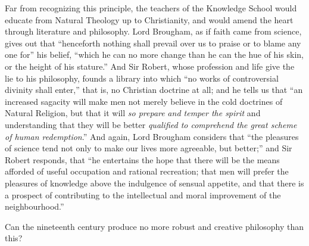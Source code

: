 Far from recognizing this principle, the teachers of the Knowledge
School would educate from Natural Theology up to Christianity, and
would amend the heart through literature and philosophy. Lord
Brougham, as if faith came from science, gives out that
``henceforth nothing shall prevail over us to praise or to blame
any one for'' his belief, ``which he can no more change than
he can the hue of his skin, or the height of his stature.'' And
Sir Robert, whose profession and life give the lie to his philosophy,
founds a library into which ``no works of controversial divinity
shall enter,'' that is, no Christian doctrine at all; and he tells
us that ``an increased sagacity will make men not merely believe
in the cold doctrines of Natural Religion, but that it will \emph{so
prepare} \emph{and temper the spirit} and understanding that
they will be better \emph{qualified to comprehend the great scheme of
human redemption}.'' And again, Lord Brougham considers that
``the pleasures of science tend not only to make our lives more
agreeable, but better;'' and Sir Robert responds, that ``he
entertains the hope that there will be the means afforded of useful
occupation and rational recreation; that men will prefer the pleasures
of knowledge above the indulgence of sensual appetite, and that there
is a prospect of contributing to the intellectual and moral
improvement of the neighbourhood.''

Can the nineteenth century produce no more robust and creative
philosophy than this?


